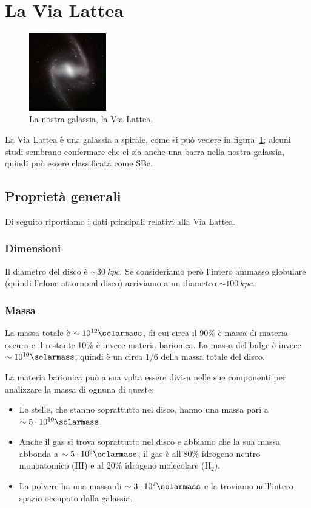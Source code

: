 \section{La Via Lattea}\label{sec:via-lattea}
\begin{figure}
    \centering
    \includegraphics[width = 0.3\textwidth]{immagini/via-lattea.png}
    \caption{La nostra galassia, la Via Lattea.}
    \label{fig:via-lattea}
\end{figure}

La Via Lattea è una galassia a spirale, come si può vedere in figura~\ref{fig:via-lattea}; alcuni studi sembrano confermare che ci sia anche una barra nella nostra galassia, quindi può essere classificata come SBc. 

\subsection{Proprietà generali}
Di seguito riportiamo i dati principali relativi alla Via Lattea.

\subsubsection{Dimensioni}
Il diametro del disco è $\sim \SI{30}{kpc}$. Se consideriamo però l'intero ammasso globulare (quindi l'alone attorno al disco) arriviamo a un diametro $\sim \SI{100}{kpc}$.

\subsubsection{Massa}
La massa totale è $\sim 10^{12} \si{\solarmass}$, di cui circa il $90\%$ è massa di materia oscura e il restante 10\% è invece materia barionica. 
La massa del bulge è invece $\sim 10^{10} \si{\solarmass}$, quindi è un circa $1/6$ della massa totale del disco.

La materia barionica può a sua volta essere divisa nelle sue componenti per analizzare la massa di ognuna di queste:
\begin{itemize}
    \item Le stelle, che stanno soprattutto nel disco, hanno una massa pari a $\sim 5 \cdot 10^{10} \si{\solarmass}$.
    \item Anche il gas si trova soprattutto nel disco e abbiamo che la sua massa abbonda a $\sim 5 \cdot 10^9 \si{\solarmass}$; il gas è all'80\% idrogeno neutro monoatomico (HI) e al 20\% idrogeno molecolare (H$_{2}$). 
    \item La polvere ha una massa di $\sim 3 \cdot 10^7 \si{\solarmass}$ e la troviamo nell'intero spazio occupato dalla galassia.
\end{itemize}

